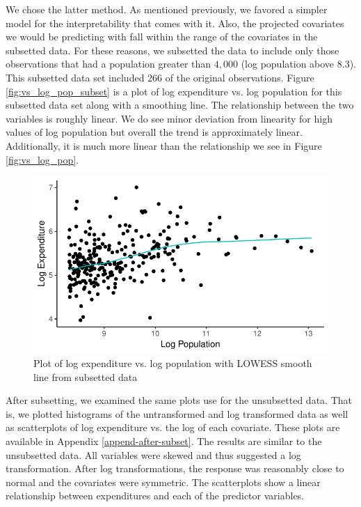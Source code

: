 \documentclass{article}\usepackage[]{graphicx}\usepackage[]{color}
\makeatletter
\def\maxwidth{ %
  \ifdim\Gin@nat@width>\linewidth
    \linewidth
  \else
    \Gin@nat@width
  \fi
}
\newenvironment{knitrout}{}{} %
\makeatother
\begin{document}
We chose the latter method. As mentioned previously, we favored a simpler model for the interpretability that comes with it. Also, the projected covariates we would be predicting with fall within the range of the covariates in the subsetted data. For these reasons, we subsetted the data to include only those observations that had a population greater than $4,000$ (log population above $8.3$). This subsetted data set included $266$ of the original observations. Figure \ref{fig:vs_log_pop_subset} is a plot of log expenditure vs. log population for this subsetted data set along with a smoothing line. The relationship between the two variables is roughly linear. We do see minor deviation from linearity for high values of log population but overall the trend is approximately linear. Additionally, it is much more linear than the relationship we see in Figure \ref{fig:vs_log_pop}.

\begin{knitrout}
\color{fgcolor}\begin{figure}[h]
\includegraphics[width=\maxwidth]{figure/r_fig_vs_log_pop_subset-1} \caption{\label{fig:vs_log_pop_subset} Plot of log expenditure vs. log population with LOWESS smooth line from subsetted data}\label{fig:r fig_vs_log_pop_subset}
\end{figure}


\end{knitrout}


After subsetting, we examined the same plots use for the unsubsetted data. That is, we plotted histograms of the untransformed and log transformed data as well as scatterplots of log expenditure vs. the log of each covariate. These plots are available in Appendix \ref{append-after-subset}. The results are similar to the unsubsetted data. All variables were skewed and thus suggested a log transformation. After log transformations, the response was reasonably close to normal and the covariates were symmetric. The scatterplots show a linear relationship between expenditures and each of the predictor variables.
\end{document}
